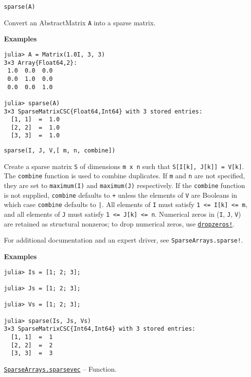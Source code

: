 \begin{adjustwidth}{2em}{0pt}


\begin{verbatim}
sparse(A)
\end{verbatim}

Convert an AbstractMatrix \texttt{A} into a sparse matrix.

\textbf{Examples}


\begin{verbatim}
julia> A = Matrix(1.0I, 3, 3)
3×3 Array{Float64,2}:
 1.0  0.0  0.0
 0.0  1.0  0.0
 0.0  0.0  1.0

julia> sparse(A)
3×3 SparseMatrixCSC{Float64,Int64} with 3 stored entries:
  [1, 1]  =  1.0
  [2, 2]  =  1.0
  [3, 3]  =  1.0
\end{verbatim}




\begin{lstlisting}
sparse(I, J, V,[ m, n, combine])
\end{lstlisting}

Create a sparse matrix \texttt{S} of dimensions \texttt{m x n} such that \texttt{S[I[k], J[k]] = V[k]}. The \texttt{combine} function is used to combine duplicates. If \texttt{m} and \texttt{n} are not specified, they are set to \texttt{maximum(I)} and \texttt{maximum(J)} respectively. If the \texttt{combine} function is not supplied, \texttt{combine} defaults to \texttt{+} unless the elements of \texttt{V} are Booleans in which case \texttt{combine} defaults to \texttt{|}. All elements of \texttt{I} must satisfy \texttt{1 <= I[k] <= m}, and all elements of \texttt{J} must satisfy \texttt{1 <= J[k] <= n}. Numerical zeros in (\texttt{I}, \texttt{J}, \texttt{V}) are retained as structural nonzeros; to drop numerical zeros, use \hyperlink{13132808383029320263}{\texttt{dropzeros!}}.

For additional documentation and an expert driver, see \texttt{SparseArrays.sparse!}.

\textbf{Examples}


\begin{verbatim}
julia> Is = [1; 2; 3];

julia> Js = [1; 2; 3];

julia> Vs = [1; 2; 3];

julia> sparse(Is, Js, Vs)
3×3 SparseMatrixCSC{Int64,Int64} with 3 stored entries:
  [1, 1]  =  1
  [2, 2]  =  2
  [3, 3]  =  3
\end{verbatim}



\end{adjustwidth}
\hypertarget{13364181309585533450}{} 
\hyperlink{13364181309585533450}{\texttt{SparseArrays.sparsevec}}  -- {Function.}

